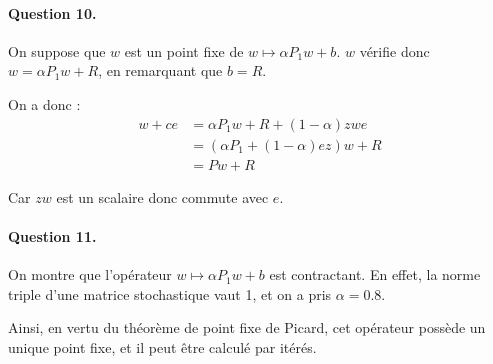 \documentclass[12pt,a4paper]{article}
\begin{document}
\paragraph*{Question 10.}
On suppose que $w$ est un point fixe de $w \mapsto \alpha P_1 w + b$. $w$ vérifie donc $w = \alpha P_1 w + R$, en remarquant que $b = R$.

On a donc :
\begin{align*}
    w + c e &= \alpha P_1 w + R + (1 - \alpha) z w e\\
    &= (\alpha P_1 + (1 - \alpha) e z)w + R \\
    &= P w + R
\end{align*}

Car $zw$ est un scalaire donc commute avec $e$.

\paragraph*{Question 11.}
On montre que l'opérateur $w \mapsto \alpha P_1 w + b$ est contractant. En effet, la norme triple d'une matrice stochastique vaut 1, et on a pris $\alpha = 0.8$.

Ainsi, en vertu du théorème de point fixe de Picard, cet opérateur possède un unique point fixe, et il peut être calculé par itérés.
\end{document}
